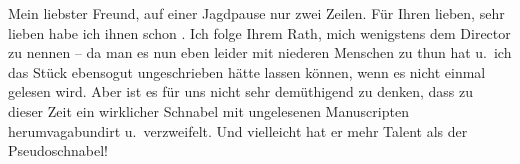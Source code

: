 \pstart{}Mein liebster Freund,\pend\vspace{0.5em}
\pstart
           auf einer Jagdpause nur zwei Zeilen. Für Ihren lieben, sehr lieben \label{K_L03851-1v}\label{K_L03851-1} habe ich ihnen schon \label{K_L03851-2v}\label{K_L03851-2}. Ich folge Ihrem Rath,
               mich wenigstens dem Director zu nennen – da man es nun eben leider mit niederen
               Menschen zu thun hat u. ich das Stück ebensogut ungeschrieben hätte lassen können, wenn es nicht einmal
               gelesen wird. Aber ist es für uns nicht sehr demüthigend zu denken, dass zu dieser
               Zeit ein wirklicher Schnabel mit ungelesenen Manuscripten herumvagabundirt
               u. verzweifelt. Und vielleicht hat er mehr Talent als der Pseudoschnabel!\pend
           
